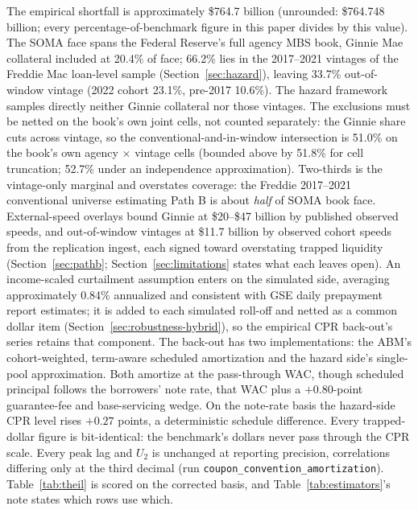 The empirical shortfall is approximately \$764.7 billion (unrounded: \$764.748 billion; every percentage-of-benchmark figure in this paper divides by this value). The SOMA face spans the Federal Reserve's full agency MBS book, Ginnie Mae collateral included at 20.4\% of face; 66.2\% lies in the 2017--2021 vintages of the Freddie Mac loan-level sample (Section~\ref{sec:hazard}), leaving 33.7\% out-of-window vintage (2022 cohort 23.1\%, pre-2017 10.6\%). The hazard framework samples directly neither Ginnie collateral nor those vintages. The exclusions must be netted on the book's own joint cells, not counted separately: the Ginnie share cuts across vintage, so the conventional-and-in-window intersection is 51.0\% on the book's own agency $\times$ vintage cells (bounded above by 51.8\% for cell truncation; 52.7\% under an independence approximation). Two-thirds is the vintage-only marginal and overstates coverage: the Freddie 2017--2021 conventional universe estimating Path B is about \emph{half} of SOMA book face. External-speed overlays bound Ginnie at \$20--\$47 billion by published observed speeds, and out-of-window vintages at \$11.7 billion by observed cohort speeds from the replication ingest, each signed toward overstating trapped liquidity (Section~\ref{sec:pathb}; Section~\ref{sec:limitations} states what each leaves open). An income-scaled curtailment assumption enters on the simulated side, averaging approximately 0.84\% annualized and consistent with GSE daily prepayment report estimates; it is added to each simulated roll-off and netted as a common dollar item (Section~\ref{sec:robustness-hybrid}), so the empirical CPR back-out's series retains that component. The back-out has two implementations: the ABM's cohort-weighted, term-aware scheduled amortization and the hazard side's single-pool approximation. Both amortize at the pass-through WAC, though scheduled principal follows the borrowers' note rate, that WAC plus a $+0.80$-point guarantee-fee and base-servicing wedge. On the note-rate basis the hazard-side CPR level rises $+0.27$ points, a deterministic schedule difference. Every trapped-dollar figure is bit-identical: the benchmark's dollars never pass through the CPR scale. Every peak lag and $U_2$ is unchanged at reporting precision, correlations differing only at the third decimal (run \texttt{coupon\_convention\_amortization}). Table~\ref{tab:theil} is scored on the corrected basis, and Table~\ref{tab:estimators}'s note states which rows use which.

